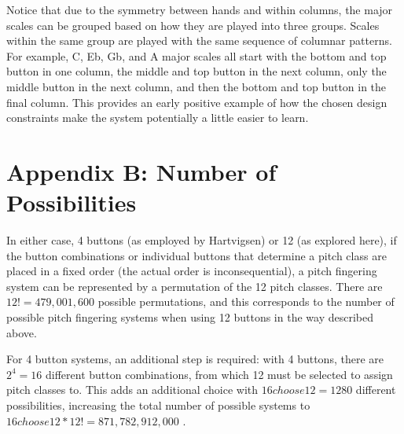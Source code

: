 \documentclass[sigconf]{nimeart}
\begin{document}
Notice that due to the symmetry between hands and within columns, the major scales can be grouped based on how they are played into three groups. Scales within the same group are played with the same sequence of columnar patterns. For example, C, Eb, Gb, and A major scales all start with the bottom and top button in one column, the middle and top button in the next column, only the middle button in the next column, and then the bottom and top button in the final column. This provides an early positive example of how the chosen design constraints make the system potentially a little easier to learn.

\section{Appendix B: Number of Possibilities}\label{appendix-b-number-of-possibilities}

In either case, 4 buttons (as employed by Hartvigsen) or 12 (as explored here), if the button combinations or individual buttons that determine a pitch class are placed in a fixed order (the actual order is inconsequential), a pitch fingering system can be represented by a permutation of the 12 pitch classes. There are $12! = 479,001,600$ possible permutations, and this corresponds to the number of possible pitch fingering systems when using 12 buttons in the way described above.

For 4 button systems, an additional step is required: with 4 buttons, there are $2^4 = 16$ different button combinations, from which 12 must be selected to assign pitch classes to. This adds an additional choice with $16choose12 = 1280$ different possibilities, increasing the total number of possible systems to $16choose12 * 12! = 871,782,912,000$ \cite{Hartvigsen2014}.




\end{document}
